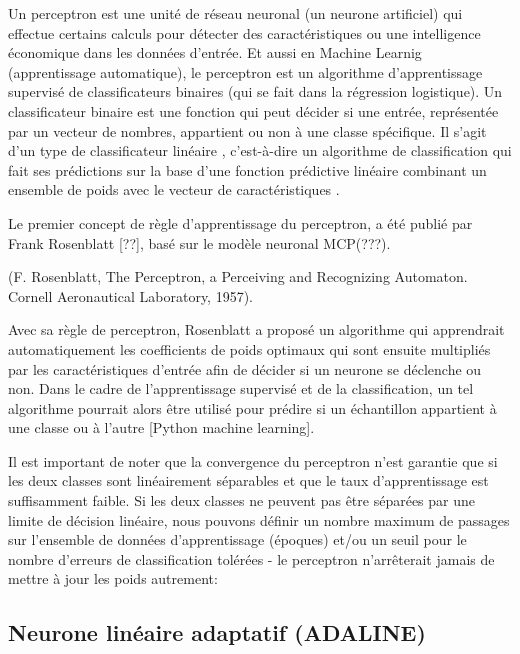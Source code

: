 	Un perceptron est une unité de réseau neuronal (un neurone artificiel) qui effectue certains calculs pour détecter des caractéristiques ou une intelligence économique dans les données d'entrée.
	Et aussi en Machine Learnig (apprentissage automatique), le perceptron est un algorithme d'apprentissage supervisé de classificateurs binaires (qui se fait dans la régression logistique). 
	Un classificateur binaire est une fonction qui peut décider si une entrée, représentée par un vecteur de nombres, appartient ou non à une classe spécifique. \cite{freund1999large} Il s'agit d'un type de classificateur linéaire , c'est-à-dire un algorithme de classification qui fait ses prédictions sur la base d'une fonction prédictive linéaire combinant un ensemble de poids avec le vecteur de caractéristiques .
	
	Le premier concept de règle d'apprentissage du perceptron, a été publié par Frank Rosenblatt [??],  basé sur le modèle neuronal MCP(???). 
	
	(F. Rosenblatt, The Perceptron, a Perceiving and Recognizing Automaton. Cornell Aeronautical Laboratory, 1957).
	
	Avec sa règle de perceptron, Rosenblatt a proposé un algorithme qui apprendrait automatiquement les coefficients de poids optimaux qui sont ensuite multipliés par les caractéristiques d'entrée afin de décider si un neurone se déclenche ou non. Dans le cadre de l'apprentissage supervisé et de la classification, un tel algorithme pourrait alors être utilisé pour prédire si un échantillon appartient à une classe ou à l'autre [Python machine learning].
	
	Il est important de noter que la convergence du perceptron n'est garantie que si les deux classes sont linéairement séparables et que le taux d'apprentissage est suffisamment faible. Si les deux classes ne peuvent pas être séparées par une limite de décision linéaire, nous pouvons définir un nombre maximum de passages sur l'ensemble de données d'apprentissage (époques) et/ou un seuil pour le nombre d'erreurs de classification tolérées - le perceptron n'arrêterait jamais de mettre à jour les poids autrement:
	
	\subsection{Neurone linéaire adaptatif (ADALINE)}
	\lipsum[1]

